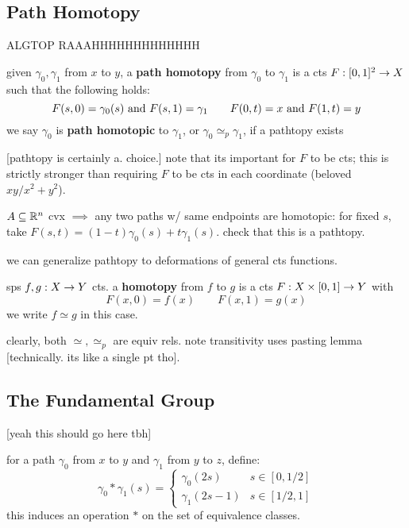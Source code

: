 \subsection{Path Homotopy}
ALGTOP RAAAHHHHHHHHHHHHH

\begin{defn}
    given $\gamma_{0},\gamma_{1}$ from $x$ to $y$, a \textbf{path homotopy}
    from $\gamma_{0}$ to $\gamma_{1}$ is a cts $F:[0,1]^{2}\rightarrow X$ such that
    the following holds:
    \begin{equation*}
        F(s,0)=\gamma_{0}(s) \textrm{ and } F(s,1)=\gamma_{1} \qquad
        F(0,t)=x \textrm{ and } F(1,t)=y
    \end{equation*}
    we say $\gamma_{0}$ is \textbf{path homotopic} to $\gamma_{1}$,
    or $\gamma_{0}\simeq_{p}\gamma_{1}$, if a pathtopy exists
\end{defn}
[pathtopy is certainly a. choice.]
note that its important for $F$ to be cts; this is strictly stronger than
requiring $F$ to be cts in each coordinate (beloved $xy/x^{2}+y^{2}$).

\begin{xmp}[source=Primary Source Material]
    $A\subseteq\mathbb{R}^{n}$ cvx $\implies$ any two paths w/ same endpoints are
    homotopic: for fixed $s$, take $F(s,t)=(1-t)\gamma_{0}(s)+t\gamma_{1}(s)$.
    check that this is a pathtopy.
\end{xmp}

we can generalize pathtopy to deformations of general cts functions.
\begin{defn}
    sps $f,g:X\rightarrow Y$ cts.
    a \textbf{homotopy} from $f$ to $g$ is a cts $F:X\times[0,1]\rightarrow Y$ with
    \begin{equation*}
        F(x,0)=f(x) \qquad F(x,1) = g(x)
    \end{equation*}
    we write $f\simeq g$ in this case.
\end{defn}
clearly, both $\simeq, \simeq_{p}$ are equiv rels.
note transitivity uses pasting lemma [technically. its like a single pt tho].

\subsection{The Fundamental Group}
[yeah this should go here tbh]

\begin{defn}
    for a path $\gamma_{0}$ from $x$ to $y$ and $\gamma_{1}$ from $y$ to $z$,
    define:
    \begin{equation*}
        \gamma_{0}*\gamma_{1}(s) =
        \begin{cases}
            \gamma_{0}(2s) & s \in[0,1/2] \\
            \gamma_{1}(2s-1) & s \in[1/2,1]
        \end{cases}
    \end{equation*}
    this induces an operation $*$ on the set of equivalence classes.
\end{defn} \

